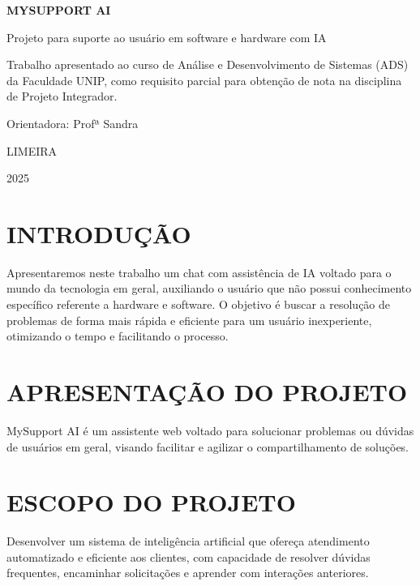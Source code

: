 \documentclass[a4paper,12pt]{article}
\begin{document}
\begin{titlepage}
    \centering
    \vspace*{2cm}
    {\normalfont\bfseries\LARGE MYSUPPORT AI \par}
    \vspace{1cm}
    {\large Projeto para suporte ao usuário em software e hardware com IA \par}
    \vspace{2cm}
    {\normalsize
        Trabalho apresentado ao curso de Análise e Desenvolvimento de Sistemas (ADS) da Faculdade UNIP, como requisito parcial para obtenção de nota na disciplina de Projeto Integrador. \par
    }
    \vspace{1cm}
    {\normalsize Orientadora: Profª Sandra \par}
    \vspace{9cm}
    {\large LIMEIRA \par}
    \vspace{0.5cm}
    {\large 2025 \par}
\end{titlepage}

\tableofcontents
\newpage

\section{INTRODUÇÃO}
Apresentaremos neste trabalho um chat com assistência de IA voltado para o mundo da tecnologia em geral, auxiliando o usuário que não possui conhecimento específico referente a hardware e software. O objetivo é buscar a resolução de problemas de forma mais rápida e eficiente para um usuário inexperiente, otimizando o tempo e facilitando o processo.

\section{APRESENTAÇÃO DO PROJETO}
MySupport AI é um assistente web voltado para solucionar problemas ou dúvidas de usuários em geral, visando facilitar e agilizar o compartilhamento de soluções.

\section{ESCOPO DO PROJETO}
Desenvolver um sistema de inteligência artificial que ofereça atendimento automatizado e eficiente aos clientes, com capacidade de resolver dúvidas frequentes, encaminhar solicitações e aprender com interações anteriores.
\end{document}
